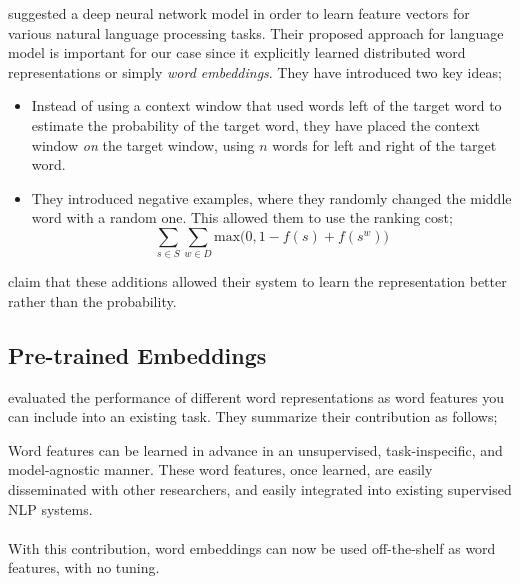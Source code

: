 \textcite{collobert_unified_2008} suggested a deep neural network model in order to learn feature vectors for various natural language processing tasks.
Their proposed approach for language model is important for our case since it explicitly learned distributed word representations or simply \emph{word embeddings}.
They have introduced two key ideas;
\begin{itemize}
    \item Instead of using a context window that used words left of the target word to estimate the probability of the target word, they have placed the context window \emph{on} the target window, using $n$ words for left and right of the target word.
    \item They introduced negative examples, where they randomly changed the middle word with a random one. This allowed them to use the ranking cost;
        \begin{displaymath}
            \sum_{s \in S} \sum_{w \in D} \text{max}\big( 0, 1 - f(s) + f(s^w)\big)
        \end{displaymath}
\end{itemize}
\textcite{collobert_unified_2008} claim that these additions allowed their system to learn the representation better rather than the probability.


\subsection{Pre-trained Embeddings}%
\label{sub:pre_trained_embeddings}

\textcite{p._turian_word_2010} evaluated the performance of different word representations as word features you can include into an existing task.
They summarize their contribution as follows;
\begin{displayquote}
    Word features can be learned in advance in an unsupervised, task-inspecific, and model-agnostic manner.
    These word features, once learned, are easily disseminated with other researchers, and easily integrated into existing supervised NLP systems. \\
    \textelp{} \\
    With this contribution, word embeddings can now be used off-the-shelf as word features, with no tuning.
\end{displayquote}

